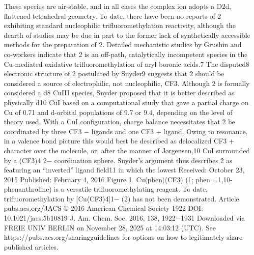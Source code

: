 These species are air-stable, and in all cases the complex ion
adopts a D2d, ﬂattened tetrahedral geometry. To date, there
have been no reports of 2 exhibiting standard nucleophilic
triﬂuoromethylation reactivity, although the dearth of studies
may be due in part to the former lack of synthetically accessible
methods for the preparation of 2. Detailed mechanistic studies
by Grushin and co-workers indicate that 2 is an oﬀ-path,
catalytically incompetent species in the Cu-mediated oxidative
triﬂuoromethylation of aryl boronic acids.7
The disputed8 electronic structure of 2 postulated by Snyder9
suggests that 2 should be considered a source of electrophilic,
not nucleophilic, CF3. Although 2 is formally considered a d8
CuIII species, Snyder proposed that it is better described as
physically d10 CuI based on a computational study that gave a
partial charge on Cu of 0.71 and d-orbital populations of 9.7 or
9.4, depending on the level of theory used. With a CuI
conﬁguration, charge balance necessitates that 2 be coordinated
by three CF3
− ligands and one CF3
+ ligand. Owing to
resonance, in a valence bond picture this would best be
described as delocalized CF3
+ character over the molecule, or,
after the manner of Jørgensen,10 CuI surrounded by a (CF3)4
2−
coordination sphere. Snyder’s argument thus describes 2 as
featuring an “inverted” ligand ﬁeld11 in which the lowest
Received:
October 23, 2015
Published: February 4, 2016
Figure 1. Cu(phen)(CF3) (1; phen =1,10-phenanthroline) is a
versatile triﬂuoromethylating reagent. To date, triﬂuoromethylation by
[Cu(CF3)4]1− (2) has not been demonstrated.
Article
pubs.acs.org/JACS
© 2016 American Chemical Society
1922
DOI: 10.1021/jacs.5b10819
J. Am. Chem. Soc. 2016, 138, 1922−1931
Downloaded via FREIE UNIV BERLIN on November 28, 2025 at 14:03:12 (UTC).
See https://pubs.acs.org/sharingguidelines for options on how to legitimately share published articles.


